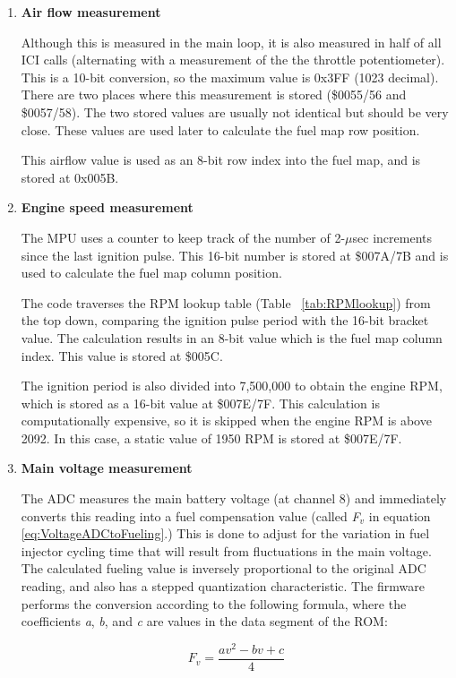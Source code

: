 \documentclass[11pt,twocolumn]{scrartcl}
\begin{document}
\begin{enumerate}
\item
\textbf{Air flow measurement}

Although this is measured in the main loop, it is also measured in half of all ICI calls (alternating with a measurement of the the throttle potentiometer). This is a 10-bit conversion, so the maximum value is 0x3FF (1023 decimal). There are two places where this measurement is stored (\$0055/56 and \$0057/58). The two stored values are usually not identical but should be very close. These values are used later to calculate the fuel map row position.

This airflow value is used as an 8-bit row index into the fuel map, and is stored at 0x005B.

\item
\textbf{Engine speed measurement}

The MPU uses a counter to keep track of the number of 2-$\mu$sec increments since the last ignition pulse. This 16-bit number is stored at \$007A/7B and is used to calculate the fuel map column position.

The code traverses the RPM lookup table (Table ~\ref{tab:RPMlookup}) from the top down, comparing the ignition pulse period with the 16-bit bracket value. The calculation results in an 8-bit value which is the fuel map column index. This value is stored at \$005C.

The ignition period is also divided into 7,500,000 to obtain the engine RPM, which is stored as a 16-bit value at \$007E/7F. This calculation is computationally expensive, so it is skipped when the engine RPM is above 2092. In this case, a static value of 1950 RPM is stored at \$007E/7F.

\item
\textbf{Main voltage measurement}

The ADC measures the main battery voltage (at channel 8) and immediately converts this reading into a fuel compensation value (called {\em F$_{v}$} in equation \ref{eq:VoltageADCtoFueling}.) This is done to adjust for the variation in fuel injector cycling time that will result from fluctuations in the main voltage. The calculated fueling value is inversely proportional to the original ADC reading, and also has a stepped quantization characteristic. The firmware performs the conversion according to the following formula, where the coefficients {\em a}, {\em b}, and {\em c} are values in the data segment of the ROM:

\begin{equation} \label{eq:VoltageADCtoFueling}
F_v = \frac{av^2 - bv + c}{4}
\end{equation}


\end{enumerate}
\end{document}
